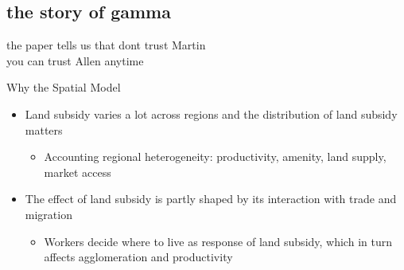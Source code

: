 \documentclass[compress]{beamer}
\begin{document}
	\subsection{the story of gamma}
	\begin{frame}
		the paper tells us that dont trust Martin \\
		you can trust Allen anytime
	\end{frame}
	
	\begin{frame}{Why the Spatial Model}
		\begin{itemize} \setlength{\itemsep}{15pt}
			\item Land subsidy varies a lot across regions and the distribution of land subsidy matters
			\begin{itemize} \setlength{\itemsep}{10pt}
				\item Accounting regional heterogeneity: productivity, amenity, land supply, market access
			\end{itemize}
			\item The effect of land subsidy is partly shaped by its interaction with trade and migration
			\begin{itemize} \setlength{\itemsep}{10pt}
				\item Workers decide where to live as response of land subsidy, which in turn affects agglomeration and productivity
			\end{itemize}
		\end{itemize}
	\end{frame}
	
\end{document}
